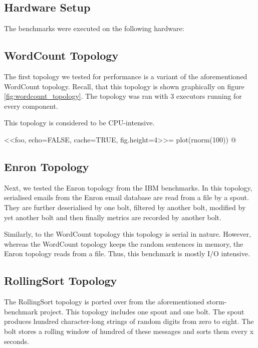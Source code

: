 
\subsection{Hardware Setup}

The benchmarks were executed on the following hardware:


\subsection{WordCount Topology}

The first topology we tested for performance is a variant of the aforementioned WordCount topology. Recall, that this topology is shown graphically on figure \ref{fig:wordcount_topology}. The topology was ran with 3 executors running for every component.

This topology is considered to be CPU-intensive. 


<<foo, echo=FALSE, cache=TRUE, fig.height=4>>=
plot(rnorm(100))
@


\subsection{Enron Topology}

Next, we tested the Enron topology from the IBM benchmarks. In this topology, serialised emails from the Enron email database are read from a file by a spout. They are further deserialised by one bolt, filtered by another bolt, modified by yet another bolt and then finally metrics are recorded by another bolt.

Similarly, to the WordCount topology this topology is serial in nature. However, whereas the WordCount topology keeps the random sentences in memory, the Enron topology reads from a file. Thus, this benchmark is mostly I/O intensive.

\subsection{RollingSort Topology}

The RollingSort topology is ported over from the aforementioned storm-benchmark project. This topology includes one spout and one bolt. The spout produces hundred character-long strings of random digits from zero to eight. The bolt stores a rolling window of hundred of these messages and sorts them every x seconds.

